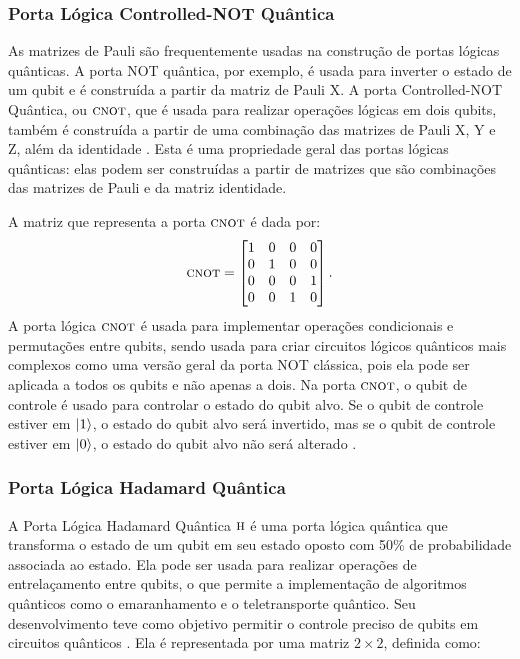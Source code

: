 \subsubsection{Porta Lógica Controlled-NOT Quântica}\label{sec:cnot}

As matrizes de Pauli são frequentemente usadas na construção de portas lógicas quânticas. A porta NOT quântica, por exemplo, é usada para inverter o estado de um qubit e é construída a partir da matriz de Pauli X. A porta Controlled-NOT Quântica, ou \(\operatorname{\textsc{cnot}}\), que é usada para realizar operações lógicas em dois qubits, também é construída a partir de uma combinação das matrizes de Pauli X, Y e Z, além da identidade \cite{CompInfoQuantica}. Esta é uma propriedade geral das portas lógicas quânticas: elas podem ser construídas a partir de matrizes que são combinações das matrizes de Pauli e da matriz identidade.

A matriz que representa a porta \(\operatorname{\textsc{cnot}}\) é dada por:
\begin{equation}\label{eq:cnot}
\operatorname{\textsc{cnot}} = \begin{bmatrix}
1 & 0 & 0 & 0 \\
0 & 1 & 0 & 0 \\
0 & 0 & 0 & 1 \\
0 & 0 & 1 & 0
\end{bmatrix}.
\end{equation}
A porta lógica \(\operatorname{\textsc{cnot}}\) é usada para implementar operações condicionais e permutações entre qubits, sendo usada para criar circuitos lógicos quânticos mais complexos como uma versão geral da porta NOT clássica, pois ela pode ser aplicada a todos os qubits e não apenas a dois. Na porta \(\operatorname{\textsc{cnot}}\), o qubit de controle é usado para controlar o estado do qubit alvo. Se o qubit de controle estiver em $\ket{1}$, o estado do qubit alvo será invertido, mas se o qubit de controle estiver em $\ket{0}$, o estado do qubit alvo não será alterado \cite{chuang}.


\subsubsection{Porta Lógica Hadamard Quântica}\label{sec:had}

A Porta Lógica Hadamard Quântica \(\operatorname{\textsc{h}}\) é uma porta lógica quântica que transforma o estado de um qubit em seu estado oposto com 50\% de probabilidade associada ao estado. Ela pode ser usada para realizar operações de entrelaçamento entre qubits, o que permite a implementação de algoritmos quânticos como o emaranhamento e o teletransporte quântico. Seu desenvolvimento teve como objetivo permitir o controle preciso de qubits em circuitos quânticos \cite{jorcuvich}. Ela é representada por uma matriz \(2{\times}2\), definida como:

